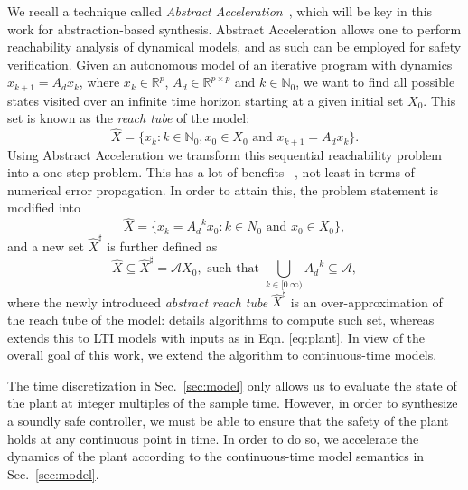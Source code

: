 \documentclass[twocolumn]{autart}    %
\newcommand{\mat}[1]{{#1}}
\renewcommand{\vec}[1]{{#1}}
\renewcommand{\note}[1]{\textcolor{red}{[#1]}}
\begin{document}
We recall a technique called \emph{Abstract Acceleration}~\cite{JSS14,cattaruzza2015unbounded}, 
which will be key in this work for abstraction-based synthesis.  
Abstract Acceleration allows one to perform reachability analysis of dynamical models, 
and as such can be employed for safety verification. 
% 
Given an autonomous model of an iterative program with dynamics 
%
$\vec{x}_{k+1}=\mat{A_d}\vec{x}_k$, 
where $\vec{x}_k \in \mathbb{R}^p$, $\mat{A_d} \in \mathbb{R}^{p \times p}$ and $k \in \mathbb N_0$, 
%
we want to find all possible states visited over an infinite time horizon starting at a given initial set $X_0$.  
This set is known as the \emph{reach tube} of the model: 
%
\begin{equation}
\hat{X} = \{ \vec{x}_k: k \in \mathbb N_0, \vec{x}_0 \in X_0 \text{ and } \vec{x}_{k+1}=\mat{A_d}\vec{x}_k\}.
\end{equation}
%
Using Abstract Acceleration we transform this sequential reachability problem into a one-step problem. 
This has a lot of benefits ~\cite{JSS14}, not least in terms of numerical error propagation.   
In order to attain this, 
the problem statement is modified 
into 
%
\begin{equation}
\hat{X} = \{ \vec{x}_k=\mat{A_d}^k\vec{x}_0: k \in N_0 \text{ and } \vec{x}_0 \in X_0 \}, 
\end{equation}
%
and a new 
set $\hat{X}^\sharp$ is further defined as 
%
\begin{equation}\label{eq:aa_reachtube}
\hat{X} \subseteq \hat{X}^\sharp = \mathcal{A}X_0, \text{ such that } \bigcup_{k \in [0\ \infty)} \mat{A_d}^k \subseteq \mathcal{A}, 
\end{equation}
%
where the newly introduced \emph{abstract reach tube} $\hat{X}^\sharp$ is an
over-approximation of the reach tube of the model: 
\cite{JSS14} details algorithms to compute such set, 
whereas \cite{cattaruzza2015unbounded} extends this to LTI models with inputs as in Eqn. \eqref{eq:plant}.  
In view of the overall goal of this work, 
we extend the algorithm to continuous-time models.  


The time discretization in Sec.~\ref{sec:model} only allows us to evaluate
the state of the plant at integer multiples of the sample time.  
However, in order to synthesize a soundly safe controller, 
we must be able to ensure that the safety of the plant holds at any continuous point in time.  
In order to do so, we accelerate the dynamics of the plant according to the continuous-time model
semantics in Sec.~\ref{sec:model}. 
\end{document}
